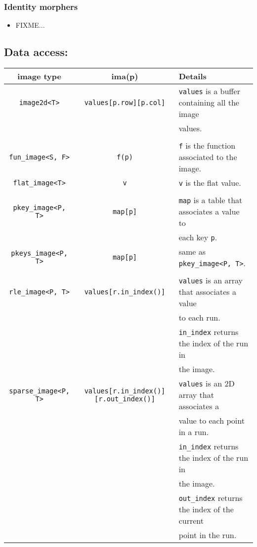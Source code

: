 \subsubsection{Identity morphers}

\begin{itemize}
\item FIXME...
\end{itemize}


\subsection{Data access:}

\begin{tabular}{ccl}

image type & ima(p) & Details\\
\hline

\verb+image2d<T>+ &
\lstinline+values[p.row][p.col]+ &
\verb+values+ is a buffer containing all the image\\
&
&
values.\\

\\

\verb+fun_image<S, F>+ &
\lstinline+f(p)+ &
\verb+f+ is the function associated to the image.\\

\verb+flat_image<T>+ &
\lstinline+v+ &
\verb+v+ is the flat value.\\

\\

\verb+pkey_image<P, T>+ &
\lstinline+map[p]+ &
\verb+map+ is a table that associates a value to\\
&
&
each key \verb+p+.\\

\verb+pkeys_image<P, T>+ &
\lstinline+map[p]+ &
same as \verb+pkey_image<P, T>+.\\

\\

\verb+rle_image<P, T>+ &
\lstinline+values[r.in_index()]+ &
\verb+values+ is an array that associates a value\\
&
&
to each run.\\
&
&
\verb+in_index+ returns the index of the run in\\
&
&
the image.\\

\verb+sparse_image<P, T>+ &
\lstinline+values[r.in_index()][r.out_index()]+ &
\verb+values+ is an 2D array that associates a\\
&
&
value to each point in a run.\\
&
&
\verb+in_index+ returns the index of the run in\\
&
&
the image.\\
&
&
\verb+out_index+ returns the index of the current\\
&
&
point in the run.\\


\end{tabular}
